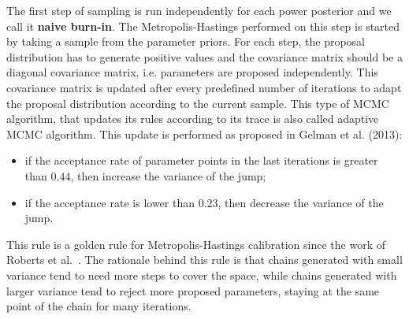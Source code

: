 %

The first step of sampling is run independently for each power posterior 
and we call it {\bf naive burn-in}. The Metropolis-Hastings performed on
this step is started by taking a sample from the parameter priors. For 
each step, the proposal distribution has to generate positive values and 
the covariance matrix should be a diagonal covariance matrix, i.e. 
parameters are proposed independently. This covariance matrix is updated 
after every predefined number of iterations to adapt the proposal 
distribution according to the current sample. This type of MCMC 
algorithm, that updates its rules according to its trace is also called
adaptive MCMC algorithm. This update is performed as proposed in Gelman 
et al. (2013): 
\begin{itemize}
\item{if the acceptance rate of parameter points in the last 
    iterations is greater than $0.44$, then increase the variance of the
    jump;}
\item{if the acceptance rate is lower than $0.23$, then decrease the 
    variance of the jump.}
\end{itemize}
This rule is a golden rule for Metropolis-Hastings calibration since the
work of Roberts et al.~\cite{Roberts1997}. The rationale behind this
rule is that chains generated with small variance tend to need more 
steps to cover the space, while chains generated with larger variance
tend to reject more proposed parameters, staying at the same point of
the chain for many iterations.


